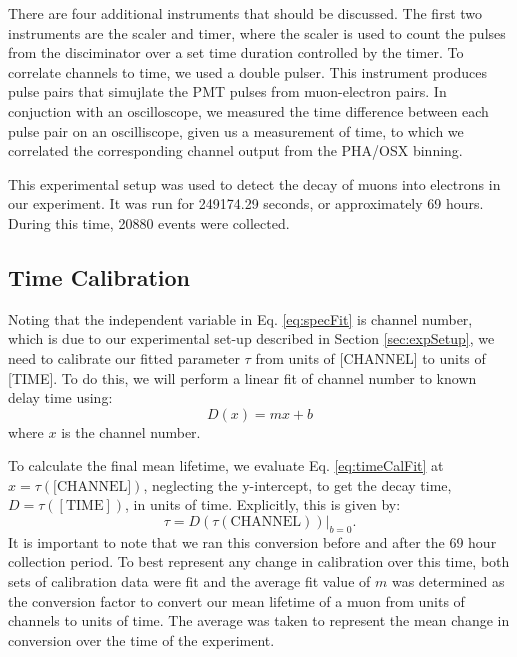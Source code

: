 \documentclass[
    aps, 
    twocolumn, 
    secnumarabic, 
    balancelastpage, 
    amsmath, 
    amssymb, 
    nofootinbib, 
    floatfix
]{revtex4-2}
\begin{document}
There are four additional instruments that should be discussed. The first two instruments are the scaler and timer, where the scaler is used to count the pulses from the disciminator over a set time duration controlled by the timer. To correlate channels to time, we used a double pulser. This instrument produces pulse pairs that simujlate the PMT pulses from muon-electron pairs. In conjuction with an oscilloscope, we measured the time difference between each pulse pair on an oscilliscope, given us a measurement of time, to which we correlated the corresponding channel output from the PHA/OSX binning.   

This experimental setup was used to detect the decay of muons into electrons in our experiment. It was run for 249174.29 seconds, or approximately 69 hours. During this time, 20880 events were collected. 

\subsection{Time Calibration}
\label{sec:timeCal}

Noting that the independent variable in Eq. \eqref{eq:specFit} is channel number, which is due to our experimental set-up described in Section \ref{sec:expSetup}, we need to calibrate our fitted parameter $\tau$ from units of [CHANNEL] to units of [TIME]. To do this, we will perform a linear fit of channel number to known delay time using:
\begin{equation}
	D(x) = mx + b
	\label{eq:timeCalFit}
\end{equation}
where $x$ is the channel number.

To calculate the final mean lifetime, we evaluate Eq. \eqref{eq:timeCalFit} at $x = \tau(\text{[CHANNEL]})$, neglecting the y-intercept, to get the decay time, $D = \tau([\text{TIME}])$, in units of time. Explicitly, this is given by:
\begin{equation}
	\tau = D(\tau(\text{CHANNEL}))\big\lvert_{b=0}.
	\label{eq:timeConvert}
\end{equation}
It is important to note that we ran this conversion before and after the 69 hour collection period. To best represent any change in calibration over this time, both sets of calibration data were fit and the average fit value of $m$ was determined as the conversion factor to convert our mean lifetime of a muon from units of channels to units of time. The average was taken to represent the mean change in conversion over the time of the experiment. 
\end{document}
